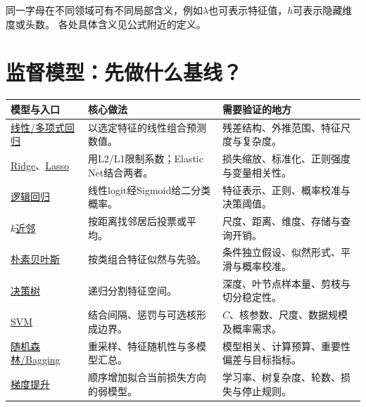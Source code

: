 同一字母在不同领域可有不同局部含义，例如$\lambda$也可表示特征值，$h$可表示隐藏维度或头数。
各处具体含义见公式附近的定义。

\section{监督模型：先做什么基线？}
\label{sec:reference-supervised}
\begingroup
\setlength{\LTpre}{3pt}\setlength{\LTpost}{4pt}
\begin{xltabular}{\textwidth}{P{30mm}P{52mm}Y}
\toprule
模型与入口 & 核心做法 & 需要验证的地方\\
\midrule
\endhead
\bottomrule
\endfoot
\hyperref[sec:linear-ols]{线性/多项式回归} & 以选定特征的线性组合预测数值。 & 残差结构、外推范围、特征尺度与复杂度。\\
\hyperref[sec:linear-ridge]{Ridge}、\hyperref[sec:linear-lasso]{Lasso} & 用L2/L1限制系数；Elastic Net结合两者。 & 损失缩放、标准化、正则强度与变量相关性。\\
\hyperref[sec:linear-logistic]{逻辑回归} & 线性logit经Sigmoid给二分类概率。 & 特征表示、正则、概率校准与决策阈值。\\
\hyperref[sec:linear-knn]{$k$近邻} & 按距离找邻居后投票或平均。 & 尺度、距离、维度、存储与查询开销。\\
\hyperref[sec:tree-naive-bayes]{朴素贝叶斯} & 按类组合特征似然与先验。 & 条件独立假设、似然形式、平滑与概率校准。\\
\hyperref[sec:tree-classification]{决策树} & 递归分割特征空间。 & 深度、叶节点样本量、剪枝与切分稳定性。\\
\hyperref[sec:svm-margin]{SVM} & 结合间隔、惩罚与可选核形成边界。 & $C$、核参数、尺度、数据规模及概率需求。\\
\hyperref[sec:tree-bagging]{随机森林/Bagging} & 重采样、特征随机性与多模型汇总。 & 模型相关、计算预算、重要性偏差与目标指标。\\
\hyperref[sec:tree-gradient-boosting]{梯度提升} & 顺序增加拟合当前损失方向的弱模型。 & 学习率、树复杂度、轮数、损失与停止规则。\\

\end{xltabular}
\endgroup


